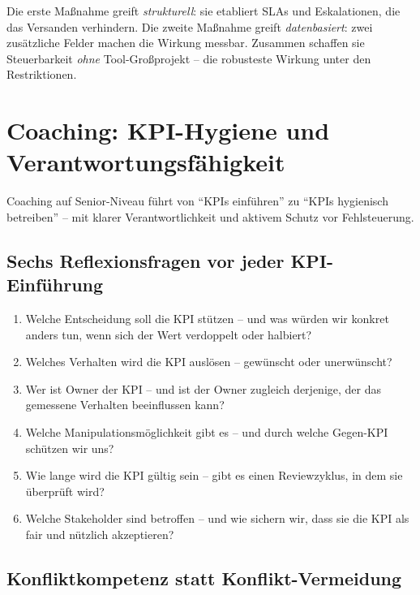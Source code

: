 \documentclass[11pt,a4paper,oneside]{article}
\begin{document}
\begin{merkbox}
Die erste Maßnahme greift \emph{strukturell}: sie etabliert SLAs und Eskalationen, die das Versanden verhindern. Die zweite Maßnahme greift \emph{datenbasiert}: zwei zusätzliche Felder machen die Wirkung messbar. Zusammen schaffen sie Steuerbarkeit \emph{ohne} Tool-Großprojekt -- die robusteste Wirkung unter den Restriktionen.
\end{merkbox}

\section{Coaching: KPI-Hygiene und Verantwortungsfähigkeit}

Coaching auf Senior-Niveau führt von ``KPIs einführen'' zu ``KPIs hygienisch betreiben'' -- mit klarer Verantwortlichkeit und aktivem Schutz vor Fehlsteuerung.

\subsection{Sechs Reflexionsfragen vor jeder KPI-Einführung}

\begin{enumerate}
  \item Welche Entscheidung soll die KPI stützen -- und was würden wir konkret anders tun, wenn sich der Wert verdoppelt oder halbiert?
  \item Welches Verhalten wird die KPI auslösen -- gewünscht oder unerwünscht?
  \item Wer ist Owner der KPI -- und ist der Owner zugleich derjenige, der das gemessene Verhalten beeinflussen kann?
  \item Welche Manipulationsmöglichkeit gibt es -- und durch welche Gegen-KPI schützen wir uns?
  \item Wie lange wird die KPI gültig sein -- gibt es einen Reviewzyklus, in dem sie überprüft wird?
  \item Welche Stakeholder sind betroffen -- und wie sichern wir, dass sie die KPI als fair und nützlich akzeptieren?
\end{enumerate}

\subsection{Konfliktkompetenz statt Konflikt-Vermeidung}
\end{document}
